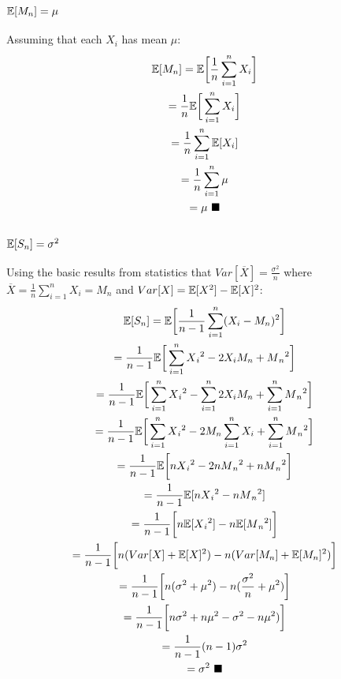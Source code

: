\documentclass[11pt, oneside]{article}   	%
\begin{document}
\subsubsection{$\Bbb E[M_n] = \mu$}
Assuming that each $X_i$ has mean $\mu$:
\begin{gather*}
\Bbb E[M_n] = \Bbb E\bigg[\frac{1}{n} \sum_{i = 1}^{n} X_i\bigg] \\
= \frac{1}{n} \Bbb E\bigg[\sum_{i = 1}^{n} X_i\bigg] \\
= \frac{1}{n} \sum_{i = 1}^{n} \Bbb E[X_i] \\
= \frac{1}{n} \sum_{i = 1}^{n} \Bbb \mu \\
= \mu \text{ } \blacksquare
\end{gather*}

\subsubsection{$\Bbb E[S_n] = \sigma^2$}
Using the basic results from statistics that $Var[\overline{X}] = \frac{\sigma^2}{n}$ where $\overline{X} = \frac{1}{n}\sum_{i = 1}^{n}X_i = M_n$ and $Var[X] = \Bbb E[X^2] - \Bbb E[X]^2$:
\begin{gather*}
\Bbb E[S_n] = \Bbb E\bigg[\frac{1}{n - 1} \sum_{i = 1}^{n} (X_i - M_n)^2\bigg] \\
= \frac{1}{n - 1} \Bbb E\bigg[ \sum_{i = 1}^{n} X{_i}^2 - 2X_i M_n  + M{_n}^2 \bigg] \\
= \frac{1}{n - 1} \Bbb E\bigg[ \sum_{i = 1}^{n} X{_i}^2 - \sum_{i = 1}^{n} 2X_i M_n  + \sum_{i = 1}^{n} M{_n}^2 \bigg] \\
= \frac{1}{n - 1} \Bbb E\bigg[ \sum_{i = 1}^{n} X{_i}^2 - 2M_n \sum_{i = 1}^{n}  X_i  + \sum_{i = 1}^{n} M{_n}^2 \bigg] \\
= \frac{1}{n - 1} \Bbb E\bigg[ n X{_i}^2 - 2n M{_n}^2 + n M{_n}^2 \bigg] \\
= \frac{1}{n - 1} \Bbb E[ nX{_i}^2 - n M{_n}^2 ] \\
= \frac{1}{n - 1} \bigg[ n \Bbb E[ X{_i}^2 ] - n \Bbb E[ M{_n}^2 ] \bigg] \\
= \frac{1}{n - 1} \bigg[ n(Var[X] + \Bbb E[X]^2) - n(Var[M_n] + \Bbb E[M_n]^2) \bigg] \\
= \frac{1}{n - 1} \bigg[ n(\sigma^2 + \mu^2) - n(\frac{\sigma^2}{n} + \mu^2) \bigg] \\
= \frac{1}{n - 1} \bigg[ n\sigma^2 + n\mu^2 - \sigma^2 - n\mu^2) \bigg] \\
= \frac{1}{n - 1} (n - 1)\sigma^2 \\
= \sigma^2 \text{ } \blacksquare
\end{gather*}
\end{document}
